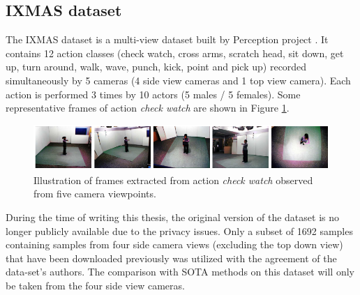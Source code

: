 
\subsection{IXMAS dataset}
    The IXMAS dataset is a multi-view dataset built by Perception project \cite{weinland2006free}.
    It contains 12 action classes (check watch, cross arms, scratch head, sit down, get up, turn around, walk, wave, punch, kick, point and pick up) recorded simultaneously by 5 cameras (4 side view cameras and 1 top view camera).
    Each action is performed 3 times by 10 actors (5 males / 5 females).
    Some representative frames of action \textit{check watch} are shown in Figure \ref{Fig:IXMAS1}.

    \begin{figure}[h]
        \centering
        \includegraphics[width=1\linewidth]{figs/IXMAS1.png}
        \caption{Illustration of frames extracted from action \textit{check watch} observed from five camera viewpoints.}
        \label{Fig:IXMAS1}
    \end{figure}

    During the time of writing this thesis, the original version of the dataset is no longer publicly available due to the privacy issues.
    Only a subset of 1692 samples containing samples from four side camera views (excluding the top down view) that have been downloaded previously was utilized with the agreement of the data-set's authors.
    The comparison with SOTA methods on this dataset will only be taken from the four side view cameras. 
